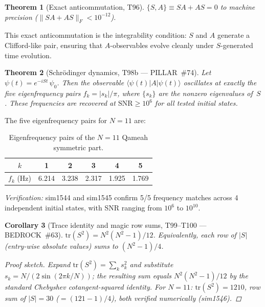 \documentclass[aps,prd,twocolumn,superscriptaddress,floatfix,nofootinbib]{revtex4-2}
\newtheorem{theorem}{Theorem}
\newtheorem{corollary}[theorem]{Corollary}
\theoremstyle{definition}
\theoremstyle{remark}
\begin{document}
\begin{theorem}[Exact anticommutation, T96]
\label{thm:anticommute}
$\{S,A\} \equiv SA + AS = 0$ to machine precision ($\|SA+AS\|_F < 10^{-12}$).
\end{theorem}

This exact anticommutation is the integrability condition: $S$ and $A$
generate a Clifford-like pair, ensuring that $A$-observables evolve
cleanly under $S$-generated time evolution.

\begin{theorem}[Schr\"odinger dynamics, T98b --- PILLAR~\#74]
\label{thm:dynamics}
Let $\psi(t) = e^{-iSt}\,\psi_0$.  Then the observable
$\langle\psi(t)|A|\psi(t)\rangle$ oscillates at exactly the five
eigenfrequency pairs $f_k = |s_k|/\pi$, where $\{s_k\}$ are the nonzero
eigenvalues of~$S$.  These frequencies are recovered at $\mathrm{SNR}
\ge 10^6$ for all tested initial states.
\end{theorem}

The five eigenfrequency pairs for $N{=}11$ are:

\begin{table}[h]
\centering
\caption{Eigenfrequency pairs of the $N{=}11$ Qameah symmetric part.}
\label{tab:eigenfreq}
\begin{tabular}{cccccc}
\toprule
$k$ & 1 & 2 & 3 & 4 & 5 \\
\midrule
$f_k$ (Hz) & 6.214 & 3.238 & 2.317 & 1.925 & 1.769 \\
\bottomrule
\end{tabular}
\end{table}

\noindent\textit{Verification:} sim1544 and sim1545 confirm 5/5
frequency matches across 4 independent initial states, with SNR ranging
from $10^6$ to $10^{10}$.

\begin{corollary}[Trace identity and magic row sums, T99--T100 --- BEDROCK~\#63]
\label{cor:trace-s2}
$\mathrm{tr}(S^2) = N^2(N^2-1)/12$.  Equivalently, each row of $|S|$
(entry-wise absolute values) sums to $(N^2-1)/4$.
\begin{proof}[Proof sketch]
Expand $\mathrm{tr}(S^2) = \sum_{k} s_k^2$ and substitute $s_k =
N/(2\sin(2\pi k/N))$; the resulting sum equals $N^2(N^2{-}1)/12$ by
the standard Chebyshev cotangent-squared identity.  For $N{=}11$:
$\mathrm{tr}(S^2)=1210$, row sum of $|S|=30$ ($=(121-1)/4$), both
verified numerically (sim1546).
\end{proof}
\end{corollary}
\end{document}
